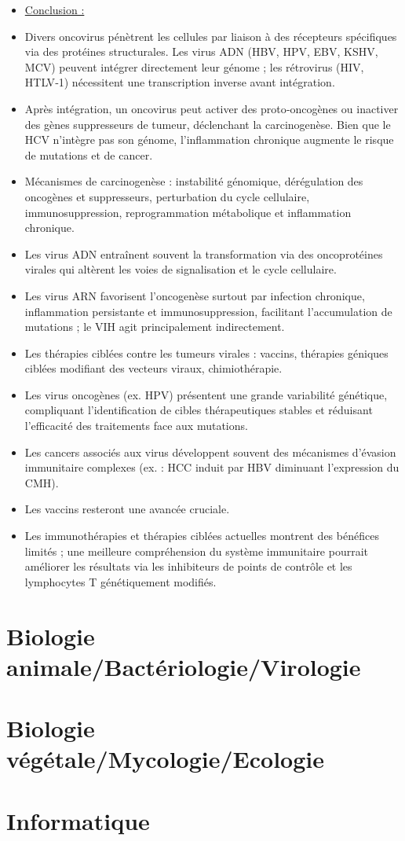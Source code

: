 \documentclass{article}
\begin{document}
\begin{itemize}
    \item \underline{Conclusion :}
    \item Divers oncovirus pénètrent les cellules par liaison à des récepteurs spécifiques via des protéines structurales. Les virus ADN (HBV, HPV, EBV, KSHV, MCV) peuvent intégrer directement leur génome ; les rétrovirus (HIV, HTLV‑1) nécessitent une transcription inverse avant intégration.
    \item Après intégration, un oncovirus peut activer des proto‑oncogènes ou inactiver des gènes suppresseurs de tumeur, déclenchant la carcinogenèse. Bien que le HCV n'intègre pas son génome, l'inflammation chronique augmente le risque de mutations et de cancer.
    \item Mécanismes de carcinogenèse : instabilité génomique, dérégulation des oncogènes et suppresseurs, perturbation du cycle cellulaire, immunosuppression, reprogrammation métabolique et inflammation chronique.
    \item Les virus ADN entraînent souvent la transformation via des oncoprotéines virales qui altèrent les voies de signalisation et le cycle cellulaire.
    \item Les virus ARN favorisent l'oncogenèse surtout par infection chronique, inflammation persistante et immunosuppression, facilitant l'accumulation de mutations ; le VIH agit principalement indirectement.
    \item Les thérapies ciblées contre les tumeurs virales : vaccins, thérapies géniques ciblées modifiant des vecteurs viraux, chimiothérapie.
    \item Les virus oncogènes (ex. HPV) présentent une grande variabilité génétique, compliquant l'identification de cibles thérapeutiques stables et réduisant l'efficacité des traitements face aux mutations.
    \item Les cancers associés aux virus développent souvent des mécanismes d'évasion immunitaire complexes (ex. : HCC induit par HBV diminuant l'expression du CMH).
    \item Les vaccins resteront une avancée cruciale.
    \item Les immunothérapies et thérapies ciblées actuelles montrent des bénéfices limités ; une meilleure compréhension du système immunitaire pourrait améliorer les résultats via les inhibiteurs de points de contrôle et les lymphocytes T génétiquement modifiés.
\end{itemize}

\newpage
\section{Biologie animale/Bactériologie/Virologie}

\newpage
\section{Biologie végétale/Mycologie/Ecologie}

\newpage
\section{Informatique}




\end{document}
